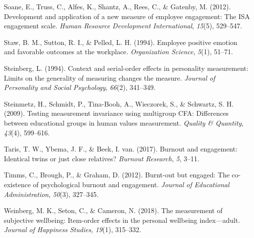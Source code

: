 \documentclass[
  man]{apa6}
\newlength{\cslhangindent}
\newlength{\cslentryspacingunit} %
\newenvironment{CSLReferences}[2] %
 {%
  \setlength{\parindent}{0pt}
  \ifodd #1
  \let\oldpar\par
  \def\par{\hangindent=\cslhangindent\oldpar}
  \fi
  \setlength{\parskip}{#2\cslentryspacingunit}
 }%
 {}
\begin{document}
\begin{CSLReferences}{1}{0}
\leavevmode{}%
Soane, E., Truss, C., Alfes, K., Shantz, A., Rees, C., \& Gatenby, M. (2012). Development and application of a new measure of employee engagement: The ISA engagement scale. \emph{Human Resource Development International}, \emph{15}(5), 529--547.

\leavevmode{}%
Staw, B. M., Sutton, R. I., \& Pelled, L. H. (1994). Employee positive emotion and favorable outcomes at the workplace. \emph{Organization Science}, \emph{5}(1), 51--71.

\leavevmode{}%
Steinberg, L. (1994). Context and serial-order effects in personality measurement: Limits on the generality of measuring changes the measure. \emph{Journal of Personality and Social Psychology}, \emph{66}(2), 341--349.

\leavevmode{}%
Steinmetz, H., Schmidt, P., Tina-Booh, A., Wieczorek, S., \& Schwartz, S. H. (2009). Testing measurement invariance using multigroup CFA: Differences between educational groups in human values measurement. \emph{Quality \& Quantity}, \emph{43}(4), 599--616.

\leavevmode{}%
Taris, T. W., Ybema, J. F., \& Beek, I. van. (2017). Burnout and engagement: Identical twins or just close relatives? \emph{Burnout Research}, \emph{5}, 3--11.

\leavevmode{}%
Timms, C., Brough, P., \& Graham, D. (2012). Burnt-out but engaged: The co-existence of psychological burnout and engagement. \emph{Journal of Educational Administration}, \emph{50}(3), 327--345.

\leavevmode{}%
Weinberg, M. K., Seton, C., \& Cameron, N. (2018). The measurement of subjective wellbeing: Item-order effects in the personal wellbeing index---adult. \emph{Journal of Happiness Studies}, \emph{19}(1), 315--332.

\end{CSLReferences}

\endgroup
\end{document}
